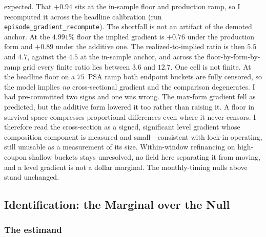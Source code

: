 \documentclass[12pt]{article}
\begin{document}
expected. That $+0.94$ sits at the in-sample floor and production ramp, so I recomputed it across the headline calibration (run \texttt{episode\_gradient\_recompute}). The shortfall is not an artifact of the demoted anchor. At the $4.991\%$ floor the implied gradient is $+0.76$ under the production form and $+0.89$ under the additive one. The realized-to-implied ratio is then $5.5$ and $4.7$, against the $4.5$ at the in-sample anchor, and across the floor-by-form-by-ramp grid every finite ratio lies between $3.6$ and $12.7$. One cell is not finite. At the headline floor on a $75$~PSA ramp both endpoint buckets are fully censored, so the model implies \emph{no} cross-sectional gradient and the comparison degenerates. I had pre-committed two signs and one was wrong. The max-form gradient fell as predicted, but the additive form lowered it too rather than raising it. A floor in survival space compresses proportional differences even where it never censors. I therefore read the cross-section as a signed, significant level gradient whose composition component is measured and small---consistent with lock-in operating, still unusable as a measurement of its size. Within-window refinancing on high-coupon shallow buckets stays unresolved, no field here separating it from moving, and a level gradient is not a dollar marginal. The monthly-timing nulls above stand unchanged.
\subsection{Identification: the Marginal over the Null}\label{sec:identification}

\subsubsection{The estimand}
\end{document}
